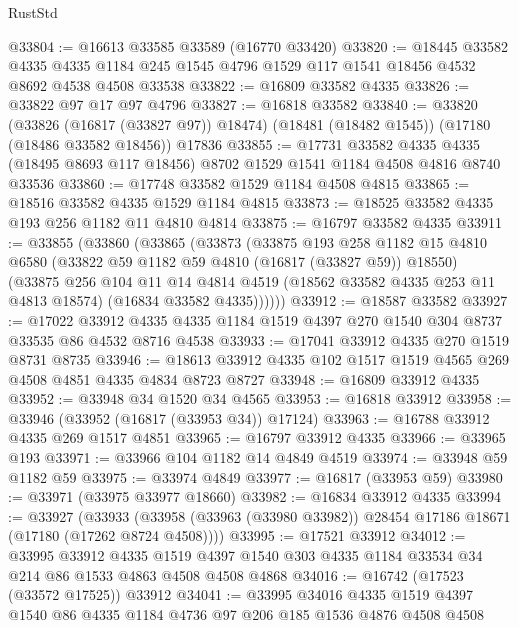 \begin{lexlean}{RustStd}
\begin{coremodule}
@33804 := @16613 @33585 @33589 (@16770 @33420)
@33820 := @18445
    @33582
    @4335
    @4335
    @1184
    @245
    @1545
    @4796
    @1529
    @117
    @1541
    @18456
    @4532
    @8692
    @4538
    @4508
    @33538
@33822 := @16809 @33582 @4335
@33826 := @33822 @97 @17 @97 @4796
@33827 := @16818 @33582
@33840 := @33820
    (@33826 (@16817 (@33827 @97)) @18474)
    (@18481 (@18482 @1545))
    (@17180 (@18486 @33582 @18456))
    @17836
@33855 := @17731
    @33582
    @4335
    @4335
    (@18495 @8693 @117 @18456)
    @8702
    @1529
    @1541
    @1184
    @4508
    @4816
    @8740
    @33536
@33860 := @17748 @33582 @1529 @1184 @4508 @4815
@33865 := @18516 @33582 @4335 @1529 @1184 @4815
@33873 := @18525 @33582 @4335 @193 @256 @1182 @11 @4810 @4814
@33875 := @16797 @33582 @4335
@33911 := @33855
    (@33860
      (@33865
        (@33873
          (@33875
            @193
            @258
            @1182
            @15
            @4810
            @6580
            (@33822 @59 @1182 @59 @4810 (@16817 (@33827 @59)) @18550)
            (@33875
              @256
              @104
              @11
              @14
              @4814
              @4519
              (@18562 @33582 @4335 @253 @11 @4813 @18574)
              (@16834 @33582 @4335))))))
@33912 := @18587 @33582
@33927 := @17022
    @33912
    @4335
    @4335
    @1184
    @1519
    @4397
    @270
    @1540
    @304
    @8737
    @33535
    @86
    @4532
    @8716
    @4538
@33933 := @17041 @33912 @4335 @270 @1519 @8731 @8735
@33946 := @18613 @33912 @4335 @102 @1517 @1519 @4565 @269 @4508 @4851 @4335 @4834 @8723 @8727
@33948 := @16809 @33912 @4335
@33952 := @33948 @34 @1520 @34 @4565
@33953 := @16818 @33912
@33958 := @33946 (@33952 (@16817 (@33953 @34)) @17124)
@33963 := @16788 @33912 @4335 @269 @1517 @4851
@33965 := @16797 @33912 @4335
@33966 := @33965 @193
@33971 := @33966 @104 @1182 @14 @4849 @4519
@33974 := @33948 @59 @1182 @59
@33975 := @33974 @4849
@33977 := @16817 (@33953 @59)
@33980 := @33971 (@33975 @33977 @18660)
@33982 := @16834 @33912 @4335
@33994 := @33927
    (@33933 (@33958 (@33963 (@33980 @33982)) @28454 @17186 @18671 (@17180 (@17262 @8724 @4508))))
@33995 := @17521 @33912
@34012 := @33995
    @33912
    @4335
    @1519
    @4397
    @1540
    @303
    @4335
    @1184
    @33534
    @34
    @214
    @86
    @1533
    @4863
    @4508
    @4508
    @4868
@34016 := @16742 (@17523 (@33572 @17525)) @33912
@34041 := @33995
    @34016
    @4335
    @1519
    @4397
    @1540
    @86
    @4335
    @1184
    @4736
    @97
    @206
    @185
    @1536
    @4876
    @4508
    @4508

\end{coremodule}
\end{lexlean}
